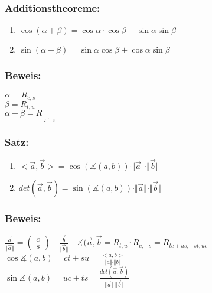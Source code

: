 \subsubsection{Additionstheoreme:}
 \begin{enumerate}
 	\item $\cos(\alpha+\beta) = \cos\alpha\cdot\cos\beta-\sin\alpha\sin\beta$
 	\item $\sin(\alpha+\beta)=\sin\alpha\cos\beta+\cos\alpha\sin\beta$
\end{enumerate}
%
%
%
\subsubsection{Beweis:}
$\alpha=R_{c,s}$\\
$\beta=R_{t,u}$\\
$\alpha+\beta=R_{\mathop{\underbrace{ct-su}}\limits_{2},\, \mathop{\underbrace{cu+st}}\limits_{3}}$
%
%
%
\subsubsection{Satz:}
\begin{enumerate}
	\item $ <\vec{a},\vec{b}>=\cos(\measuredangle(a,b))\cdot\Vert\vec{a}\Vert
	\cdot\Vert\vec{b}\Vert$
	\item $det(\vec{a},\vec{b})=\sin(\measuredangle(a,b))\cdot\Vert\vec{a}\Vert
	\cdot \Vert\vec{b}\Vert$
\end{enumerate}
%
%
%
\subsubsection{Beweis:}
$\frac{\vec{a}}{\Vert\vec{a}\Vert}=\begin{pmatrix} c \\ s \end{pmatrix} \quad \frac{\vec{b}}{\Vert\vec{b}\Vert} \quad \measuredangle(\vec{a},\vec{b}=R_{t,u}\cdot R_{c,-s}=R_{tc+us,-st,uc}$\\
$\cos\measuredangle(a,b)=ct+su=\frac{<a,b>}{\Vert a \Vert \cdot \Vert b\Vert}$\\
$\sin\measuredangle(a,b)=uc+ts=\frac{det(\vec{a},\vec{b})}{\Vert\vec{a}\Vert\cdot\Vert\vec{b}\Vert}$
%
%
%

